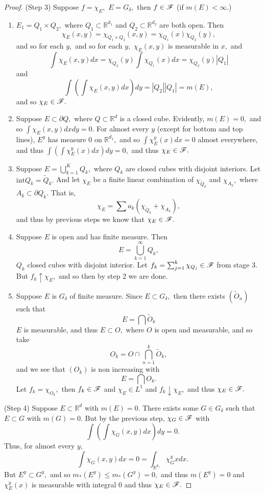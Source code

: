 \documentclass[10pt, oneside]{article}
\newcommand{\bbR}{\mathbb{R}}
\theoremstyle{definition}
\begin{document}
\begin{proof}
(Step 3) Suppose $f = \chi_E,$ $E = G_\delta,$ then $f \in \cal F$ (if $m(E)< \infty.$)
\begin{enumerate}
    \item $E_1 = Q_1 \times Q_2,$ where $Q_1 \subset \bbR^{d_1}$ and $Q_2 \subset \bbR^{d_2}$ are both open. Then 
    \[\chi_{E}(x,y) = \chi_{Q_1 \times Q_2}(x,y) = \chi_{Q_1}(x) \chi_{Q_2}(y),\] and so for each $y,$ and so for each $y,$ $\chi_E(x,y)$ is measurable in $x,$ and 
    \[\int \chi_E(x,y)dx = \chi_{Q_2}(y)\int \chi_{Q_1}(x)dx = \chi_{Q_2}(y)|Q_1|\] and 
    \[\int \left(\int \chi_E(x,y)dx\right)dy = |Q_2||Q_1| = m(E),\] and so $\chi_E \in \cal F.$
    \item Suppose $E \subset \partial Q,$ where $Q\subset \bbR^d$ is a closed cube. Evidently, $m(E) = 0,$ and so $\int \chi_E(x,y) dx dy = 0.$ For almost every $y$ (except for bottom and top lines), $E^y$ has measure $0$ on $\bbR^{d_1},$ and so $\int\chi_E^y(x)dx = 0$ almost everywhere, and thus $\int\left(\int\chi_E^y(x)dx \right)dy = 0,$ and thus $\chi_E \in \cal F.$
    \item Suppose $E = \bigcup_{k=1}^K Q_k,$ where $Q_k$ are closed cubes with disjoint interiors. Let $\text{int}Q_k = \tilde{Q}_k.$ And let $\chi_E$ be a finite linear combination of $\chi_{\tilde{Q}_k}$ and $\chi_{A_k},$ where $A_k\subset \partial Q_k.$ That is,
    \[\chi_E = \sum a_k\left(\chi_{\tilde{Q}_k} + \chi_{A_k}\right),\] and thus by previous steps we know that $\chi_E \in \cal F.$
    \item Suppose $E$ is open and has finite measure. Then 
    \[E = \bigcup_{k=1}^\infty Q_k,\] $Q_k$ closed cubes with disjoint interior. Let $f_k = \sum_{j=1}^k \chi_{Q_j} \in \cal F$ from stage 3. But $f_k \uparrow \chi_E,$ and so then by step 2 we are done.
    \item Suppose $E$ is $G_\delta$ of finite measure. Since $E \subset G_\delta,$ then there exists $(\tilde{O}_n)$ such that 
    \[E = \bigcap \tilde{ O}_k\] $E$ is measurable, and thus $E\subset O,$ where $O$ is open and measurable, and so take 
    \[O_k = O \cap \bigcap_{n=1}^k \tilde{O}_k,\] and we see that $(O_k)$ is non increasing with 
    \[E = \bigcap O_k.\] Let $f_k = \chi_{O_k},$ then $f_k \in \cal F$ and $\chi_E  \in L^1$ and $f_k \downarrow \chi_E,$ and thus $\chi_E \in \cal F.$
\end{enumerate}
(Step 4) Suppose $E \subset \bbR^d$ with $m(E) = 0$. There exists some $G \in G_\delta$ such that $E \subset G$ with $m(G) = 0.$ But by the previous step, $\chi_G \in \cal F$ with 
\[\int \left(\int \chi_G(x,y)dx\right)dy = 0.\] Thus, for almost every $y,$ 
\[\int \chi_G(x,y)dx = 0 = \int_{\bbR^{d_1}}\chi^y_{G}x dx.\] But $E^y \subset G^y,$ and so $m_\ast(E^y)\leq m_\ast(G^y) = 0,$ and thus $m(E^y) = 0$ and $\chi_{E}^y(x)$ is measurable with integral $0$ and thus $\chi_E \in \cal F.$


\end{proof}
\end{document}
